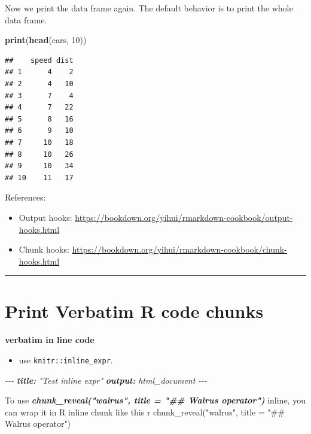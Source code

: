 \documentclass[
  a4paper,
  twoside,
  openright]{book}
\newenvironment{Shaded}{\begin{snugshade}}{\end{snugshade}}
\newcommand{\AnnotationTok}[1]{\textcolor[rgb]{0.56,0.35,0.01}{\textbf{\textit{#1}}}}
\newcommand{\CommentTok}[1]{\textcolor[rgb]{0.56,0.35,0.01}{\textit{#1}}}
\newcommand{\DecValTok}[1]{\textcolor[rgb]{0.00,0.00,0.81}{#1}}
\newcommand{\FunctionTok}[1]{\textcolor[rgb]{0.13,0.29,0.53}{\textbf{#1}}}
\newcommand{\InformationTok}[1]{\textcolor[rgb]{0.56,0.35,0.01}{\textbf{\textit{#1}}}}
\newcommand{\NormalTok}[1]{#1}
\providecommand{\tightlist}{%
  \setlength{\itemsep}{0pt}\setlength{\parskip}{0pt}}
\theoremstyle{definition}
\theoremstyle{definition}
\theoremstyle{definition}
\theoremstyle{definition}
\theoremstyle{remark}
\begin{document}
Now we print the data frame again. The default behavior is to print the whole data frame.

\begin{Shaded}
\begin{Highlighting}[]
\FunctionTok{print}\NormalTok{(}\FunctionTok{head}\NormalTok{(cars, }\DecValTok{10}\NormalTok{))}
\end{Highlighting}
\end{Shaded}

\begin{verbatim}
##    speed dist
## 1      4    2
## 2      4   10
## 3      7    4
## 4      7   22
## 5      8   16
## 6      9   10
## 7     10   18
## 8     10   26
## 9     10   34
## 10    11   17
\end{verbatim}

References:

\begin{itemize}
\tightlist
\item
  Output hooks: \url{https://bookdown.org/yihui/rmarkdown-cookbook/output-hooks.html}
\item
  Chunk hooks: \url{https://bookdown.org/yihui/rmarkdown-cookbook/chunk-hooks.html}
\end{itemize}

\begin{center}\rule{0.5\linewidth}{0.5pt}\end{center}

\section{Print Verbatim R code chunks}\label{print-verbatim-r-code-chunks}

\textbf{verbatim in line code}

\begin{itemize}
\tightlist
\item
  use \texttt{knitr::inline\_expr}.
\end{itemize}

\begin{Shaded}
\begin{Highlighting}[]
\CommentTok{{-}{-}{-}}
\AnnotationTok{title:}\CommentTok{ "Test inline expr"}
\AnnotationTok{output:}\CommentTok{ html\_document}
\CommentTok{{-}{-}{-}}

\NormalTok{To use }\InformationTok{\textasciigrave{}chunk\_reveal("walrus", title = "\#\# Walrus operator")\textasciigrave{}}\NormalTok{ inline, you can wrap it in R inline chunk like this \textasciigrave{}}\InformationTok{\textasciigrave{} \textasciigrave{}}\NormalTok{r chunk\_reveal("walrus", title = "\#\# Walrus operator")\textasciigrave{} \textasciigrave{}\textasciigrave{}}
\end{Highlighting}
\end{Shaded}
\end{document}
